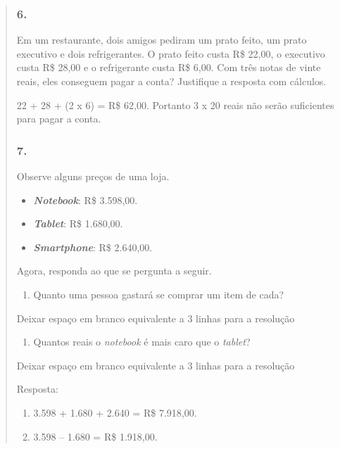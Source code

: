 \begin{enumerate}
\begin{escolha}
\begin{enumerate}
\begin{itemize}
\begin{itemize}
\begin{escolha}
\begin{quote}
\begin{escolha}
\subsubsection{6.}\label{section-70}

Em um restaurante, dois amigos pediram um prato feito, um prato executivo
e dois refrigerantes. O prato feito custa R\$ 22,00, o executivo custa R\$
28,00 e o refrigerante custa R\$ 6,00. Com três notas de vinte reais, eles
conseguem pagar a conta? Justifique a resposta com cálculos.

22 + 28 + (2 x 6) = R\$ 62,00.
Portanto 3 x 20 reais não serão suficientes para pagar a conta.

\subsubsection{7.}\label{section-71}

Observe alguns preços de uma loja.

\begin{itemize}
  \item \textbf{\textit{Notebook}}: R\$ 3.598,00.
  \item \textbf{\textit{Tablet}}: R\$ 1.680,00.
  \item \textbf{\textit{Smartphone}}: R\$ 2.640,00.
\end{itemize}

Agora, responda ao que se pergunta a seguir.

\begin{enumerate}
\def\labelenumi{\alph{enumi})}
\item
  Quanto uma pessoa gastará se comprar um item de cada?
\end{enumerate}

Deixar espaço em branco equivalente a 3 linhas para a resolução

\begin{enumerate}
\def\labelenumi{\alph{enumi})}
\item
  Quantos reais o \textit{notebook} é mais caro que o \textit{tablet}?
\end{enumerate}

Deixar espaço em branco equivalente a 3 linhas para a resolução

Resposta:

\begin{enumerate}
\def\labelenumi{\alph{enumi})}
\item
  3.598 + 1.680 + 2.640 = R\$ 7.918,00.
\item
  3.598 -- 1.680 = R\$ 1.918,00.
\end{enumerate}


\end{escolha}
\end{quote}
\end{escolha}
\end{itemize}
\end{itemize}
\end{enumerate}
\end{escolha}
\end{enumerate}
